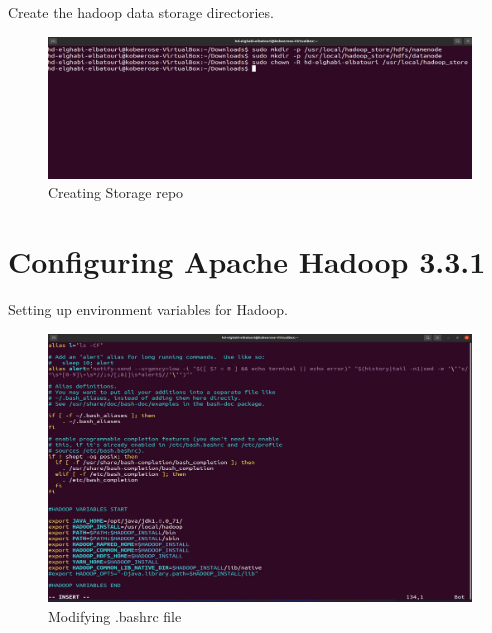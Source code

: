 \begin{spacing}{1.2}
\par Create the hadoop data storage directories.
\\
\begin{figure}[!htb] 
\begin{center} 
\includegraphics[width=1\linewidth]{Big_Data/Hadoop/Apache Hadoop Installation/Creating Storage repo} 
\end{center} 
\caption{Creating Storage repo} 
\end{figure} 
\FloatBarrier

\section{Configuring Apache Hadoop 3.3.1 }

\par Setting up environment variables for Hadoop.
\\
\begin{figure}[!htb] 
\begin{center} 
\includegraphics[width=1\linewidth]{Big_Data/Hadoop/Apache Hadoop Installation/Modifying .bashrc file} 
\end{center} 
\caption{Modifying .bashrc file} 
\end{figure} 
\FloatBarrier


\end{spacing}
